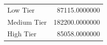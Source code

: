 \begin{tabular}{lD{.}{.}{7}}
\toprule
Low Tier & 87115.0000000 \\
Medium Tier & 182200.0000000 \\
High Tier & 85058.0000000 \\
\bottomrule
\end{tabular}
